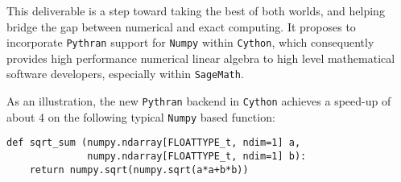 This deliverable is a step toward taking the best of both worlds, and
helping bridge the gap between numerical and exact computing. It
proposes to incorporate \texttt{Pythran} support for \texttt{Numpy}
within \texttt{Cython}, which consequently provides high performance
numerical linear algebra to high level mathematical software developers,
especially within \texttt{SageMath}.

As an illustration, the new \texttt{Pythran} backend in \texttt{Cython}
achieves a speed-up of about 4 on the following typical \texttt{Numpy}
based function:

\begin{verbatim}
def sqrt_sum (numpy.ndarray[FLOATTYPE_t, ndim=1] a,
              numpy.ndarray[FLOATTYPE_t, ndim=1] b):
    return numpy.sqrt(numpy.sqrt(a*a+b*b))
\end{verbatim}
